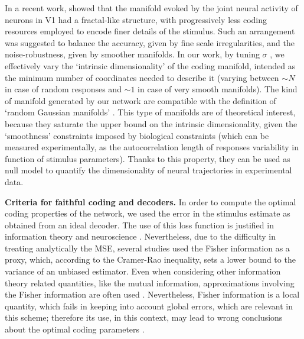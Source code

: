 \documentclass[a4paper]{article}%
\begin{document}
In a recent work, \cite{Stringer2019High-dimensionalCortex} showed that the
manifold evoked by the joint neural activity of neurons in V1 had a
fractal-like structure, with progressively less coding resources employed to
encode finer details of the stimulus. Such an arrangement was suggested to
balance the accuracy, given by fine scale irregularities, and the
noise-robustness, given by smoother manifolds. In our work, by tuning $\sigma$
, we effectively vary the `intrinsic dimensionality' of the coding manifold,
intended as the minimum number of coordinates needed to describe it (varying
between $\sim N$ in case of random responses and $\sim1$ in case of very
smooth manifolds). The kind of manifold generated by our network are
compatible with the definition of `random Gaussian manifolds'
\cite[]{Gao2017AMeasurement,Lahiri2016RandomManifolds}. This type of manifolds
are of theoretical interest, because they saturate the upper bound on the
intrinsic dimensionality, given the `smoothness' constraints imposed by biological constraints (which can be
measured experimentally, as the autocorrelation length of responses
variability in function of stimulus parameters). Thanks to this property, they
can be used as null model to quantify the dimensionality of neural
trajectories in experimental data.

\textbf{Criteria for faithful coding and decoders.} In order to compute the
optimal coding properties of the network, we used the error in the stimulus
estimate as obtained from an ideal decoder. The use of this loss function is
justified in information theory \cite[]{Cover2005ElementsTheory} and
neuroscience \cite[]{Salinas1994VectorRates,Dayan2001TheoreticalSystems}.
Nevertheless, due to the difficulty in treating analytically the MSE, several
studies used the Fisher information as a proxy, which, according to the Cramer-Rao
inequality, sets a lower bound to the variance of an unbiased estimator. Even
when considering other information theory related quantities, like the mutual
information, approximations involving the Fisher information are often used
\cite[]{Brunel1998MutualCoding,Wei2016MutualCoding,Huang2019ApproximationsCoding}. Nevertheless, Fisher information is a local quantity, which fails in keeping
into account global errors, which are relevant in this scheme; therefore its
use, in this context, may lead to wrong conclusions about the optimal coding
parameters
\cite[]{Bethge2002OptimalFails,Yaeli2010Error-basedNeurons,Berens2011ReassessingFunctions}.
\end{document}
